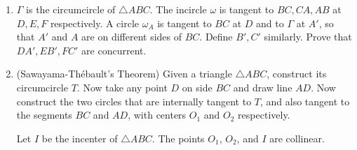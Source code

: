 \documentclass[12pt]{scrartcl}
\begin{document}
\begin{enumerate}
    \item $\Gamma$ is the circumcircle of $\triangle ABC$. The incircle $\omega$ is tangent to $BC, CA, AB$ at $D, E, F$ respectively. A circle $\omega_A$ is tangent to $BC$ at $D$ and to $\Gamma$ at $A'$, so that $A'$ and $A$ are on different sides of $BC$. Define $B', C'$ similarly. Prove that $DA', EB', FC'$ are concurrent.

    \item (Sawayama-Thébault's Theorem) Given a triangle $\triangle ABC$, construct its circumcircle $T$. Now take any point $D$ on side $BC$ and draw line $AD$. Now construct the two circles that are internally tangent to $T$, and also tangent to the segments $BC$ and $AD$, with centers $O_1$ and $O_2$ respectively.

    Let $I$ be the incenter of $\triangle ABC$. The points $O_1$, $O_2$, and $I$ are collinear.
\end{enumerate}
\end{document}
